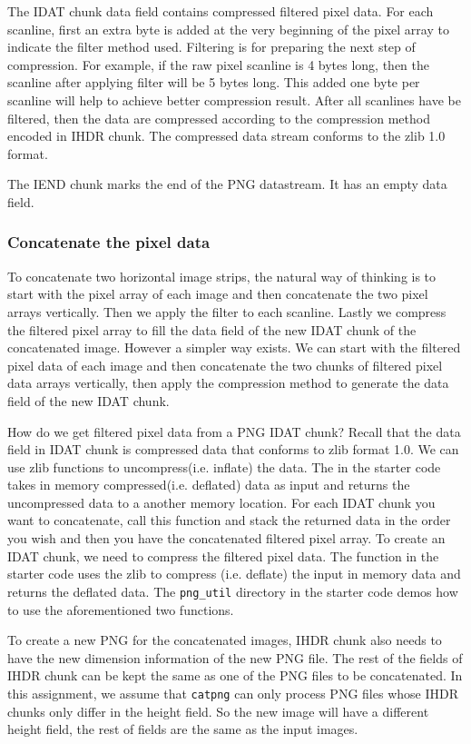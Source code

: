The IDAT chunk data field contains compressed filtered pixel data. For each scanline, first an extra byte is added at the very beginning of the pixel array to indicate the filter method used. Filtering is for preparing the next step of compression. For example, if the raw pixel scanline is 4 bytes long, then the scanline after applying filter will be 5 bytes long. This added one byte per scanline will help to achieve better compression result. After all scanlines have be filtered, then the data are compressed according to the compression method encoded in IHDR chunk. The compressed data stream conforms to the zlib 1.0 format.

The IEND chunk marks the end of the PNG datastream. It has an empty data field.

\subsubsection{Concatenate the pixel data}
To concatenate two horizontal image strips, the natural way of thinking is to start with the pixel array of each image and then concatenate the two pixel arrays vertically. Then we apply the filter to each scanline. Lastly we compress the filtered pixel array to fill the data field of the new IDAT chunk of the concatenated image. However a simpler way exists. We can start with the filtered pixel data of each image and then concatenate the two chunks of filtered pixel data arrays vertically, then apply the compression method to generate the data field of the new IDAT chunk.

How do we get filtered pixel data from a PNG IDAT chunk? Recall that the data field in IDAT chunk is compressed data that conforms to zlib format 1.0. We can use zlib functions to uncompress(i.e. inflate) the data. The  in the starter code takes in memory compressed(i.e. deflated) data as input and returns the uncompressed data to a another memory location. For each IDAT chunk you want to concatenate, call this function and stack the returned data in the order you wish and then you have the concatenated filtered pixel array. To create an IDAT chunk, we need to compress the filtered pixel data. The  function in the starter code uses the zlib to compress (i.e. deflate) the input in memory data and returns the deflated data. The \verb+png_util+ directory in the starter code demos how to use the aforementioned two functions.

To create a new PNG for the concatenated images, IHDR chunk also needs to have the new dimension information of the new PNG file. The rest of the fields of IHDR chunk can be kept the same as one of the PNG files to be concatenated. In this assignment, we assume that \verb+catpng+ can only process PNG files whose IHDR chunks only differ in the height field. So the new image will have a different height field, the rest of fields are the same as the input images.




